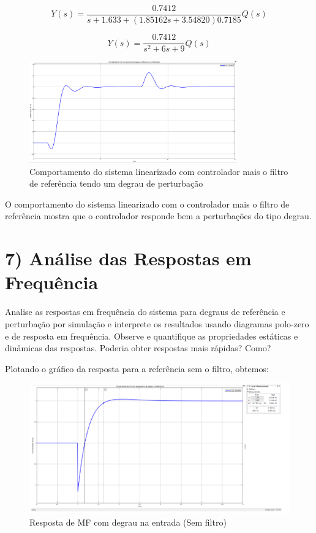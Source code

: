 \documentclass[a4paper,12pt]{report}
\begin{document}
\[
Y(s) = \frac{0.7412}{s + 1.633 + (1.85162s + 3.54820)0.7185}Q(s)
\]

\[
Y(s) = \frac{0.7412}{s^2 + 6s + 9}Q(s)
\]

\begin{figure}[H]
\centering
\includegraphics[width=0.8\textwidth]{figura16.png}
\caption{Comportamento do sistema linearizado com controlador mais o filtro de referência tendo um degrau de perturbação}
\end{figure}    

O comportamento do sistema linearizado com o controlador mais o filtro de referência mostra que o controlador responde bem a perturbações do tipo degrau.

\section{7) Análise das Respostas em Frequência}

Analise as respostas em frequência do sistema para degraus de referência e perturbação por simulação e interprete os resultados usando diagramas polo-zero e de resposta em frequência. Observe e quantifique as propriedades estáticas e dinâmicas das respostas. Poderia obter respostas mais rápidas? Como?

Plotando o gráfico da resposta para a referência sem o filtro, obtemos:

\begin{figure}[H]
    \centering
    \includegraphics[width=0.8\linewidth]{Imagens/Grafico com mf na entrada.png}
    \caption{Resposta de MF com degrau na entrada (Sem filtro)}
    \label{fig:enter-label}
\end{figure}
\end{document}
